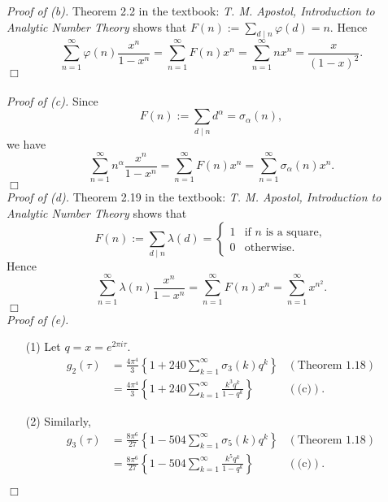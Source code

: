 \documentclass{article}
\begin{document}
\emph{Proof of (b).}
  Theorem 2.2 in the textbook: \emph{T. M. Apostol, Introduction to Analytic Number Theory}
  shows that $F(n) := \sum_{d \mid n} \varphi(d) = n$.
  Hence
  \[
    \sum_{n=1}^{\infty} \varphi(n)\frac{x^n}{1-x^n}
    = \sum_{n=1}^{\infty} F(n)x^n
    = \sum_{n=1}^{\infty} n x^n
    = \frac{x}{(1-x)^2}.
  \]
$\Box$ \\\\



\emph{Proof of (c).}
  Since
  \[
    F(n) := \sum_{d \mid n} d^{\alpha} = \sigma_\alpha(n),
  \]
  we have
  \[
    \sum_{n=1}^{\infty} n^{\alpha}\frac{x^n}{1-x^n}
    = \sum_{n=1}^{\infty} F(n)x^n
    = \sum_{n=1}^{\infty} \sigma_\alpha(n) x^n.
  \]
$\Box$ \\



\emph{Proof of (d).}
  Theorem 2.19 in the textbook: \emph{T. M. Apostol, Introduction to Analytic Number Theory}
  shows that
  \begin{equation*}
    F(n) := \sum_{d \mid n} \lambda(d) =
    \begin{cases}
      1 & \text{if $n$ is a square}, \\
      0 & \text{otherwise}.
    \end{cases}
  \end{equation*}
  Hence
  \[
    \sum_{n=1}^{\infty} \lambda(n)\frac{x^n}{1-x^n}
    = \sum_{n=1}^{\infty} F(n)x^n
    = \sum_{n=1}^{\infty} x^{n^2}.
  \]
$\Box$ \\



\emph{Proof of (e).}
\begin{enumerate}
\item[(1)]
  Let $q = x = e^{2\pi i \tau}$.
  \begin{align*}
    g_2(\tau)
    &= \frac{4\pi^4}{3} \left\{ 1 + 240 \sum_{k=1}^{\infty} \sigma_3(k) q^k \right\}
      &(\text{Theorem 1.18}) \\
    &= \frac{4\pi^4}{3} \left\{ 1 + 240 \sum_{k=1}^{\infty} \frac{k^3 q^k}{1-q^k} \right\}
      &(\text{(c)}).
  \end{align*}

\item[(2)]
  Similarly,
  \begin{align*}
    g_3(\tau)
    &= \frac{8\pi^6}{27} \left\{ 1 - 504 \sum_{k=1}^{\infty} \sigma_5(k) q^k \right\}
      &(\text{Theorem 1.18}) \\
    &= \frac{8\pi^6}{27} \left\{ 1 - 504 \sum_{k=1}^{\infty} \frac{k^5 q^k}{1-q^k} \right\}
      &(\text{(c)}).
  \end{align*}
\end{enumerate}
$\Box$ \\\\
\end{document}
